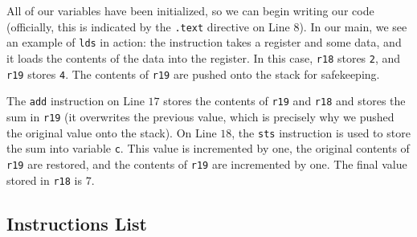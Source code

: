 All of our variables have been initialized, so we can begin writing our code (officially, this is indicated by the \verb!.text! directive on Line $8$). In our main, we see an example of \verb!lds! in action: the instruction takes a register and some data, and it loads the contents of the data into the register. In this case, \verb!r18! stores \verb!2!, and \verb!r19! stores \verb!4!. The contents of \verb!r19! are pushed onto the stack for safekeeping. 


The \verb!add! instruction on Line $17$ stores the contents of \verb!r19! and \verb!r18! and stores the sum in \verb!r19! (it overwrites the previous value, which is precisely why we pushed the original value onto the stack). On Line $18$, the \verb!sts! instruction is used to store the sum into variable \verb!c!. This value is incremented by one, the original contents of \verb!r19! are restored, and the contents of \verb!r19! are incremented by one. The final value stored in \verb!r18! is $7$. 



\subsection{Instructions List}

